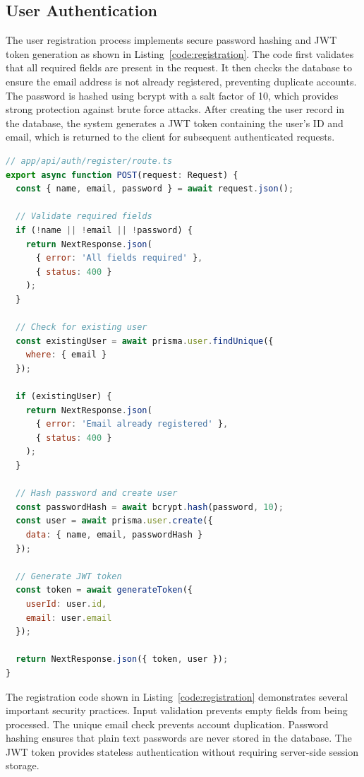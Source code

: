 \subsection{User Authentication}

The user registration process implements secure password hashing and JWT token generation as shown in Listing~\ref{code:registration}. The code first validates that all required fields are present in the request. It then checks the database to ensure the email address is not already registered, preventing duplicate accounts. The password is hashed using bcrypt with a salt factor of 10, which provides strong protection against brute force attacks. After creating the user record in the database, the system generates a JWT token containing the user's ID and email, which is returned to the client for subsequent authenticated requests.

\begin{lstlisting}[language=JavaScript, caption=User Registration Implementation, label=code:registration]
// app/api/auth/register/route.ts
export async function POST(request: Request) {
  const { name, email, password } = await request.json();
  
  // Validate required fields
  if (!name || !email || !password) {
    return NextResponse.json(
      { error: 'All fields required' }, 
      { status: 400 }
    );
  }
  
  // Check for existing user
  const existingUser = await prisma.user.findUnique({
    where: { email }
  });
  
  if (existingUser) {
    return NextResponse.json(
      { error: 'Email already registered' }, 
      { status: 400 }
    );
  }
  
  // Hash password and create user
  const passwordHash = await bcrypt.hash(password, 10);
  const user = await prisma.user.create({
    data: { name, email, passwordHash }
  });
  
  // Generate JWT token
  const token = await generateToken({
    userId: user.id,
    email: user.email
  });
  
  return NextResponse.json({ token, user });
}
\end{lstlisting}

The registration code shown in Listing~\ref{code:registration} demonstrates several important security practices. Input validation prevents empty fields from being processed. The unique email check prevents account duplication. Password hashing ensures that plain text passwords are never stored in the database. The JWT token provides stateless authentication without requiring server-side session storage.

